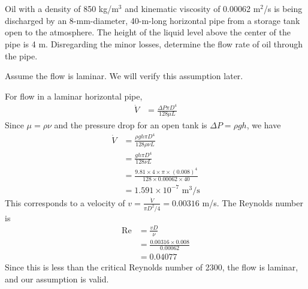 \section{}
Oil with a density of 850 kg/m$^3$ and kinematic viscosity of 0.00062 m$^2$/s is being discharged by an 8-mm-diameter, 
40-m-long horizontal pipe from a storage tank open to the atmosphere. The height of the liquid level above the center 
of the pipe is 4 m. Disregarding the minor losses, determine the flow rate of oil through the pipe.

Assume the flow is laminar. We will verify this assumption later.

For flow in a laminar horizontal pipe, 
\begin{align*}
    \dot{V} &= \frac{\Delta P \pi D^4}{128 \mu L} 
\end{align*}
Since $\mu =\rho \nu$ and the pressure drop for an open tank is $\Delta P = \rho g h$, we have
\begin{align*}
    \dot{V} &= \frac{\rho g h \pi D^4}{128 \rho \nu L} \\
    &= \frac{g h \pi D^4}{128 \nu L} \\
    &= \frac{9.81 \times 4 \times \pi \times (0.008)^4}{128 \times 0.00062 \times 40} \\
    &= \boxed{1.591 \times 10^{-7} \text{ m}^3/\text{s}}
\end{align*}
This corresponds to a velocity of $v = \frac{\dot{V}}{\pi D^2/4} = 0.00316$ m/s. The Reynolds number is
\begin{align*}
    \text{Re} &= \frac{v D}{\nu} \\
    &= \frac{0.00316 \times 0.008}{0.00062} \\
    &= \boxed{0.04077}
\end{align*}
Since this is less than the critical Reynolds number of 2300, the flow is laminar, and our assumption is valid.